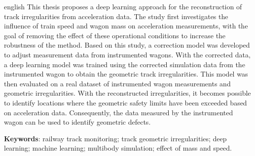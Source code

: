 \begin{resumo}[Abstract]
 \begin{otherlanguage*}{english}
    This thesis proposes a deep learning approach for the reconstruction of track irregularities from acceleration data. The study first investigates the influence of train speed and wagon mass on acceleration measurements, with the goal of removing the effect of these operational conditions to increase the robustness of the method. Based on this study, a correction model was developed to adjust measurement data from instrumented wagons. With the corrected data, a deep learning model was trained using the corrected simulation data from the instrumented wagon to obtain the geometric track irregularities. This model was then evaluated on a real dataset of instrumented wagon measurements and geometric irregularities. With the reconstructed irregularities, it becomes possible to identify locations where the geometric safety limits have been exceeded based on acceleration data. Consequently, the data measured by the instrumented wagon can be used to identify geometric defects.

    \textbf{Keywords}: railway track monitoring; track geometric irregularities; deep learning; machine learning; multibody simulation; effect of mass and speed.
 \end{otherlanguage*}
\end{resumo}
